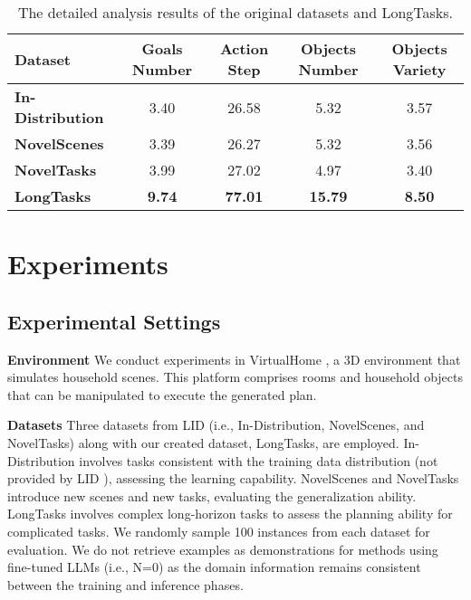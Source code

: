 \begin{table}[h]
    \centering
    \caption{The detailed analysis results of the original datasets and LongTasks.}
\begin{tabular}{l|c|c|c|c}
    \hline
    \textbf{Dataset}& \textbf{Goals Number}&\textbf{Action Step} & \textbf{Objects Number} & \textbf{Objects Variety}\\
    \hline
     \textbf{In-Distribution}& 3.40& 26.58 & 5.32 & 3.57 \\
     \textbf{NovelScenes}& 3.39& 26.27 & 5.32 & 3.56 \\
     \textbf{NovelTasks}& 3.99& 27.02 & 4.97 & 3.40 \\
     \textbf{LongTasks}& \textbf{9.74}& \textbf{77.01} & \textbf{15.79} & \textbf{8.50} \\
    \hline
\end{tabular}
\label{Table 1}
\end{table}

\section{Experiments}

\subsection{Experimental Settings}

\textbf{Environment} We conduct experiments in VirtualHome \cite{DBLP:conf/cvpr/PuigRBLWF018}, a 3D environment that simulates household scenes. This platform comprises rooms and household objects that can be manipulated to execute the generated plan. 

\noindent \textbf{Datasets} Three datasets from LID \cite{DBLP:conf/nips/LiPPDWF0HAAAM0Z22} (i.e., In-Distribution, NovelScenes, and NovelTasks) along with our created dataset, LongTasks, are employed. In-Distribution involves tasks consistent with the training data distribution (not provided by LID \cite{DBLP:conf/nips/LiPPDWF0HAAAM0Z22}), assessing the learning capability. NovelScenes and NovelTasks introduce new scenes and new tasks, evaluating the generalization ability. LongTasks involves complex long-horizon tasks to assess the planning ability for complicated tasks. We randomly sample 100 instances from each dataset for evaluation. We do not retrieve examples as demonstrations for methods using fine-tuned LLMs (i.e., N=0) as the domain information remains consistent between the training and inference phases.

